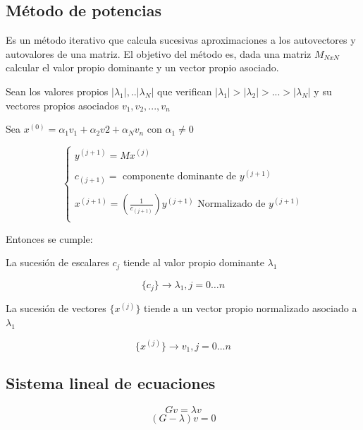 \documentclass{article}
\begin{document}
\label{puntuacion}

\subsection{Método de potencias}
\begin{description}


\label{sub:pot} 
\item[Métodos de la potencias] Es un método iterativo que calcula sucesivas aproximaciones a los autovectores y autovalores de una matriz.
El objetivo del método es, dada una matriz $ M_{NxN} $ calcular el valor propio dominante y un vector propio asociado.

Sean los valores propios $ |\lambda_1|, .. |\lambda_N| $ que verifican $ |\lambda_1| > |\lambda_2| > ... > |\lambda_N| $ y su vectores propios asociados $ v_1, v_2, ..., v_n $

Sea $ x^{(0)} = \alpha_1 v_1 + \alpha_2 v2 + \alpha_N v_n $  con $ \alpha_1 \neq 0 $

\begin{equation*}
  \left\lbrace
  \begin{array}{l}
     y^{(j+1)} =  Mx^{(j)} \\ \\
     c_{(j+1)} = \text{ componente dominante de } y^{(j+1)} \\ \\
     x^{(j+1)} =  (\frac{1}{c_{(j+1)}}) y^{(j+1)} \text{ Normalizado de } y^{(j+1)} \\
  \end{array}
  \right.
\end{equation*}

Entonces se cumple:

La sucesión de escalares $ {c_j} $ tiende al valor propio dominante $ \lambda_1 $

$$
\{c_j\} \to \lambda_1 , j=0 \dots n
$$


La sucesión de vectores  $ \{x^{(j)}\}$ tiende a un vector propio normalizado asociado a $ \lambda_1 $

$$
\{x^{(j)}\} \to v_1 , j = 0 \dots n
$$

\end{description}


\subsection{Sistema lineal de ecuaciones}
\label{sub:sis}
\begin{equation} \label{eq:SLi}
Gv = \lambda v
\end{equation}
\begin{equation} \label{eq:SL}
(G-\lambda)v = 0
\end{equation}
\end{document}

